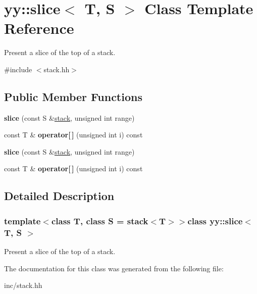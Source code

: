 \hypertarget{classyy_1_1slice}{}\section{yy\+:\+:slice$<$ T, S $>$ Class Template Reference}
\label{classyy_1_1slice}


Present a slice of the top of a stack.  




{\ttfamily \#include $<$stack.\+hh$>$}

\subsection*{Public Member Functions}
\begin{DoxyCompactItemize}
\item 
\hypertarget{classyy_1_1slice_a09b1750a81ae90227fdceb482fa06797}{}{\bfseries slice} (const S \&\hyperlink{classyy_1_1stack}{stack}, unsigned int range)\label{classyy_1_1slice_a09b1750a81ae90227fdceb482fa06797}

\item 
\hypertarget{classyy_1_1slice_ad44e52c28c2962f9dd5bf327510c1237}{}const T \& {\bfseries operator\mbox{[}$\,$\mbox{]}} (unsigned int i) const \label{classyy_1_1slice_ad44e52c28c2962f9dd5bf327510c1237}

\item 
\hypertarget{classyy_1_1slice_a09b1750a81ae90227fdceb482fa06797}{}{\bfseries slice} (const S \&\hyperlink{classyy_1_1stack}{stack}, unsigned int range)\label{classyy_1_1slice_a09b1750a81ae90227fdceb482fa06797}

\item 
\hypertarget{classyy_1_1slice_ad44e52c28c2962f9dd5bf327510c1237}{}const T \& {\bfseries operator\mbox{[}$\,$\mbox{]}} (unsigned int i) const \label{classyy_1_1slice_ad44e52c28c2962f9dd5bf327510c1237}

\end{DoxyCompactItemize}


\subsection{Detailed Description}
\subsubsection*{template$<$class T, class S = stack$<$\+T$>$$>$class yy\+::slice$<$ T, S $>$}

Present a slice of the top of a stack. 

The documentation for this class was generated from the following file\+:\begin{DoxyCompactItemize}
\item 
inc/stack.\+hh\end{DoxyCompactItemize}
